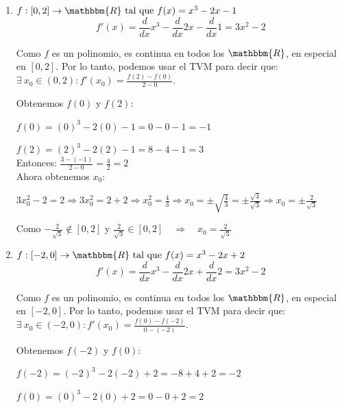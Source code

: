 \documentclass[12pt]{article}
\begin{document}
\begin{enumerate}[\hspace{9px} a)]
    \item \(f: [0,2] \rightarrow \mathbbm{R} \ \text{tal que} \ f(x)=x^3-2x-1\)\\

        \begin{equation*}
            f'(x)=\displaystyle\frac{d}{dx}x^3-\frac{d}{dx}2x-\frac{d}{dx}1=3x^2-2
        \end{equation*}

        Como $f$ es un polinomio, es continua en todos los $\mathbbm{R}$, en especial en $[0,2]$. Por lo tanto, podemos usar el TVM para decir que: \(\exists \ x_0 \in (0,2) : f'(x_0)=\displaystyle\frac{f(2)-f(0)}{2-0}\).

        Obtenemos $f(0)$ y $f(2)$:

        \(f(0)=(0)^3-2(0)-1=0-0-1=-1\)

        \(f(2)=(2)^3-2(2)-1=8-4-1=3\)\\

        Entonces: \quad \(\displaystyle\frac{3-(-1)}{2-0}=\frac{4}{2}=2\)\\

        Ahora obtenemos $x_0$:

         \qquad \(3x_0^2-2=2 \Rightarrow 3x_0^2=2+2 \Rightarrow x_0^2=\displaystyle\frac{4}{3} \Rightarrow x_0=\pm\sqrt{\frac{4}{3}}=\pm\frac{\sqrt{4}}{\sqrt{3}} \Rightarrow x_0=\pm\frac{2}{\sqrt{3}}\)

         Como \(-\displaystyle\frac{2}{\sqrt{3}} \notin [0,2]\)  y  \(\displaystyle\frac{2}{\sqrt{3}} \in [0,2] \quad \Longrightarrow \quad x_0=\displaystyle\frac{2}{\sqrt{3}}\)

    \item \(f: [-2,0] \rightarrow \mathbbm{R} \ \text{tal que} \ f(x)=x^3-2x+2\)\\

    \begin{equation*}
        f'(x)=\displaystyle\frac{d}{dx}x^3-\frac{d}{dx}2x+\frac{d}{dx}2=3x^2-2
    \end{equation*}

        Como $f$ es un polinomio, es continua en todos los $\mathbbm{R}$, en especial en $[-2,0]$. Por lo tanto, podemos usar el TVM para decir que: \(\exists \ x_0 \in (-2,0) : f'(x_0)=\displaystyle\frac{f(0)-f(-2)}{0-(-2)}\).

        Obtenemos $f(-2)$ y $f(0)$:

        \(f(-2)=(-2)^3-2(-2)+2=-8+4+2=-2\)

        \(f(0)=(0)^3-2(0)+2=0-0+2=2\)\\


\end{enumerate}
\end{document}
